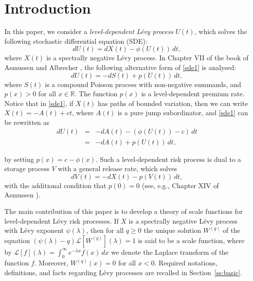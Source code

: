 \documentclass[12pt,reqno]{amsart}
\newcommand{\red}{\textcolor[rgb]{1.00,0.00,0.00}}
\theoremstyle{definition}
\theoremstyle{remark}
\newcommand{\ind}{\mathbf{1}}
\begin{document}
\section{Introduction}\label{sec:intro}
In this paper, we consider a \textit{level-dependent L\'evy process} $U(t)$, which solves
the following stochastic differential equation (SDE):
\begin{equation}\label{sde1}
dU(t) =dX(t)-\phi(U(t))\,dt, 
\end{equation}
where $X(t)$ is a spectrally negative 
L\'evy process.
In Chapter VII of the book of Asmussen and Albrecher \cite{asmussen_albrecher_2010}, the following alternative form of \eqref{sde1} is analysed:
 \begin{equation}\label{sde2}
dU(t) =-dS(t)+p(U(t))\,dt, 
\end{equation}
where $S(t)$ is a compound Poisson process with non-negative summands,  and $p(x)>0$ for all $x\in\mathbb{R}$. The function $p(x)$ is a level-dependent premium rate.
Notice that in \eqref{sde1}, if $X(t)$ has paths of bounded variation, then we can write  $X(t)=-A(t)+ct$, where $A(t)$ is a pure jump subordinator, and \eqref{sde1} can be rewritten as
\begin{eqnarray*}
dU(t) &=&-dA(t)-(\phi(U(t))-c)\,dt\\
&=&-dA(t)+p(U(t))\,dt,
\end{eqnarray*}

by setting  $p(x)=c-\phi(x)$.
Such a level-dependent risk process is dual to a storage process $V$ with a general release rate, which solves
\begin{equation}\label{sde.storage}
  dV(t)=-dX(t)-p(V(t))\,dt,\end{equation}
with the additional condition that $p(0)=0$ (see, e.g., Chapter XIV of Asmussen \cite{asmussen2003}).



The main contribution of this paper is to develop a theory of scale functions for level-dependent L\'evy risk processes.
If $X$ is a spectrally negative L\'evy process with L\'evy exponent $\psi(\lambda)$, then for all $q\ge0$ 
 the unique solution $W^{(q)}$ of the equation $(\psi(\lambda)-q)\mathcal{L}[W^{(q)}](\lambda)=1$ is said to be a 
 scale function, where by $\mathcal{L}[f](\lambda)=\int_0^\infty e^{-\lambda x} f(x)\,dx$ we denote
 the Laplace transform of the function $f$. Moreover, $W^{(q)}(x)=0$ for all $x<0$.
Required notations, definitions, and facts regarding L\'evy processes are recalled in Section~\ref{ss:basic}.
\end{document}
